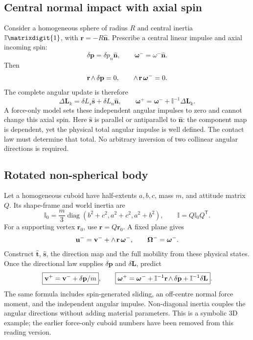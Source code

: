 \documentclass[11pt,a4paper]{article}
\newcommand{\rw}[1]{\mathord{#1\mkern2mu\wedge}}
\newcommand{\lwedge}[1]{\mathord{\wedge\mkern2mu#1}}
\newcommand{\id}{\matrixdigit{1}}
\newcommand{\inertia}{\mathbb I}
\begin{document}
\subsection{Central normal impact with axial spin}
Consider a homogeneous sphere of radius $R$ and central inertia $\inertia\id$, with $\mathbf{r}=-R\hat{\mathbf{n}}$. Prescribe a central linear impulse and axial incoming spin:
\begin{equation}
\delta \mathbf{p}=\delta p_n\hat{\mathbf{n}},\qquad
\boldsymbol{\omega}^- =\omega^-\hat{\mathbf{n}}.
\end{equation}
Then
\begin{equation}
\rw{\mathbf{r}}\,\delta \mathbf{p}=0,\qquad
\lwedge{\mathbf{r}}\,\boldsymbol{\omega}^-=0.
\end{equation}
The complete angular update is therefore
\begin{equation}
\boxed{\Delta \mathbf{L}_k=\delta L_s\hat{\mathbf{s}}+\delta L_n\hat{\mathbf{n}}},\qquad
\boldsymbol{\omega}^+=\boldsymbol{\omega}^-+\inertia^{-1}\Delta \mathbf{L}_k.
\end{equation}
A force-only model sets these independent angular impulses to zero and cannot change this axial spin. Here $\hat{\mathbf{s}}$ is parallel or antiparallel to $\hat{\mathbf{n}}$: the component map is dependent, yet the physical total angular impulse is well defined. The contact law must determine that total. No arbitrary inversion of two collinear angular directions is required.

\subsection{Rotated non-spherical body}
Let a homogeneous cuboid have half-extents $a,b,c$, mass $m$, and attitude matrix $Q$. Its shape-frame and world inertia are
\begin{equation}
\inertia_0=\frac m3\operatorname{diag}(b^2+c^2,a^2+c^2,a^2+b^2),\qquad
\inertia=Q\inertia_0Q^{\mathsf T}.
\end{equation}
For a supporting vertex $\mathbf{r}_0$, use $\mathbf{r}=Q\mathbf{r}_0$. A fixed plane gives
\begin{equation}
\mathbf{u}^- =\mathbf{v}^-+\lwedge{\mathbf{r}}\,\boldsymbol{\omega}^-,\qquad
\boldsymbol{\Omega}^- =\boldsymbol{\omega}^-.
\end{equation}
Construct $\hat{\mathbf{t}}$, $\hat{\mathbf{s}}$, the direction map and the full mobility from these physical states. Once the directional law supplies $\delta \mathbf{p}$ and $\delta \mathbf{L}$, predict
\begin{equation}
\boxed{\mathbf{v}^+=\mathbf{v}^-+\delta \mathbf{p}/m},\qquad
\boxed{\boldsymbol{\omega}^+=\boldsymbol{\omega}^-
+\inertia^{-1}\rw{\mathbf{r}}\,\delta \mathbf{p}
+\inertia^{-1}\delta \mathbf{L}}.
\end{equation}
The same formula includes spin-generated sliding, an off-centre normal force moment, and the independent angular impulse. Non-diagonal inertia couples the angular directions without adding material parameters. This is a symbolic 3D example; the earlier force-only cuboid numbers have been removed from this reading version.
\end{document}
